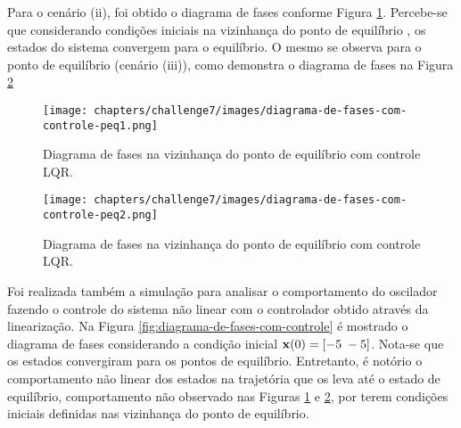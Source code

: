 Para o cenário (ii), foi obtido o diagrama de fases conforme Figura
\ref{fig:diagrama-de-fases-com-controle-na-vizinhanca-do-peq-1}. Percebe-se que
considerando condições iniciais na vizinhança do ponto de equilíbrio \peqone, os
estados do sistema convergem para o equilíbrio. O mesmo se observa para o ponto
de equilíbrio \peqtwo (cenário (iii)), como demonstra o diagrama de fases na Figura
\ref{fig:diagrama-de-fases-com-controle-na-vizinhanca-do-peq-2}

\begin{figure}[H]
    \caption{Diagrama de fases na vizinhança do ponto de equilíbrio \peqone com
    controle LQR.}
    \label{fig:diagrama-de-fases-com-controle-na-vizinhanca-do-peq-1}
    \centering
    \texttt{[image: chapters/challenge7/images/diagrama-de-fases-com-controle-peq1.png]}
\end{figure}

\begin{figure}[H]
    \caption{Diagrama de fases na vizinhança do ponto de equilíbrio \peqtwo com
    controle LQR.}
    \label{fig:diagrama-de-fases-com-controle-na-vizinhanca-do-peq-2}
    \centering
    \texttt{[image: chapters/challenge7/images/diagrama-de-fases-com-controle-peq2.png]}
\end{figure}

Foi realizada também a simulação para analisar o comportamento do oscilador
fazendo o controle do sistema não linear com o controlador obtido através da
linearização. Na Figura \ref{fig:diagrama-de-fases-com-controle} é mostrado o
diagrama de fases considerando a condição inicial $\ssvec{x}(0) = [-5
\thickspace -5]$. Nota-se que os estados convergiram para os pontos de
equilíbrio. Entretanto, é notório o comportamento não linear dos estados na
trajetória que os leva até o estado de equilíbrio, comportamento não observado
nas Figuras \ref{fig:diagrama-de-fases-com-controle-na-vizinhanca-do-peq-1} e
\ref{fig:diagrama-de-fases-com-controle-na-vizinhanca-do-peq-2}, por terem
condições iniciais definidas nas vizinhança do ponto de equilíbrio. 

